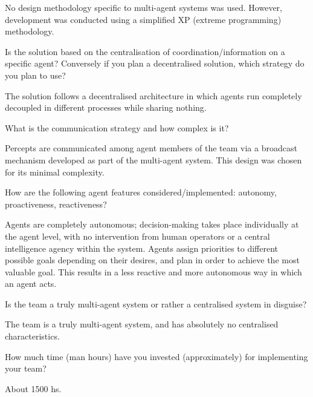 No design methodology specific to multi-agent systems
was used. However, development was conducted using a simplified XP (extreme
programming) methodology. 

\begin{question}
Is the solution based on the centralisation of coordination/information on
a specific agent? Conversely if you plan a decentralised solution, which
strategy do you plan to use?  
\end{question}

The solution follows a decentralised
architecture in which agents run completely decoupled in different processes
while sharing nothing.

\begin{question}
What is the communication strategy and how complex is it?  
\end{question}

Percepts are
communicated among agent members of the team via a broadcast mechanism
developed as part of the multi-agent system. This design was chosen for its
minimal complexity.

\begin{question}
How are the following agent features considered/implemented: autonomy,
proactiveness, reactiveness?  
\end{question}

Agents are completely autonomous;
decision-making takes place individually at the agent level, with no
intervention from human operators or a central intelligence agency within the
system.  Agents assign priorities to different possible goals depending on
their desires, and plan in order to achieve the most valuable goal. This
results in a less reactive and more autonomous way in which an agent acts.

\begin{question}
Is the team a truly multi-agent system or rather a centralised system in
disguise?  
\end{question}

The team is a truly multi-agent system, and has absolutely no
centralised characteristics.

\begin{question}
How much time (man hours) have you invested (approximately) for
implementing your team?  
\end{question}


About 1500 hs.

